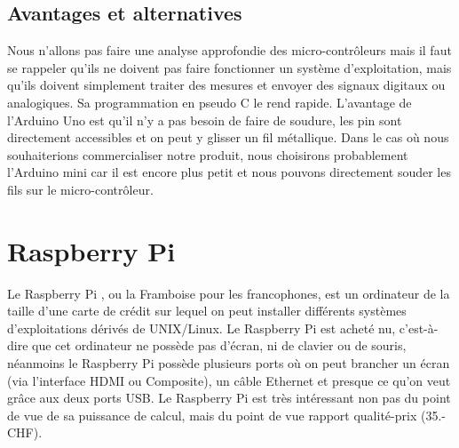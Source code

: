 \documentclass[a4paper,11pt]{report}
\begin{document}
{\subsection{Avantages et alternatives}
Nous n'allons pas faire une analyse approfondie des micro-contrôleurs mais il faut se rappeler qu'ils ne doivent pas faire fonctionner un système d'exploitation, mais qu'ils doivent simplement traiter des mesures et envoyer des signaux digitaux ou analogiques. Sa programmation en pseudo C le rend rapide. L'avantage de l'Arduino Uno est qu'il n'y a pas besoin de faire de soudure, les pin sont directement accessibles et on peut y glisser un fil métallique. Dans le cas où nous souhaiterions commercialiser notre produit, nous choisirons probablement l'Arduino mini car il est encore plus petit et nous pouvons directement souder les fils sur le micro-contrôleur.

\section{Raspberry Pi}
Le Raspberry Pi \cite{RaspberryPiCaracteristiques}, ou la Framboise pour les francophones, est un ordinateur de la taille d'une carte de crédit sur lequel on peut installer différents systèmes d'exploitations dérivés de UNIX/Linux. Le Raspberry Pi est acheté nu, c'est-à-dire que cet ordinateur ne possède pas d'écran, ni de clavier ou de souris, néanmoins le Raspberry Pi possède plusieurs ports où on peut brancher un écran (via l'interface HDMI ou Composite), un câble Ethernet et presque ce qu'on veut grâce aux deux ports USB. Le Raspberry Pi est très intéressant non pas du point de vue de sa puissance de calcul, mais du point de vue rapport qualité-prix (35.- CHF).

}
\end{document}
